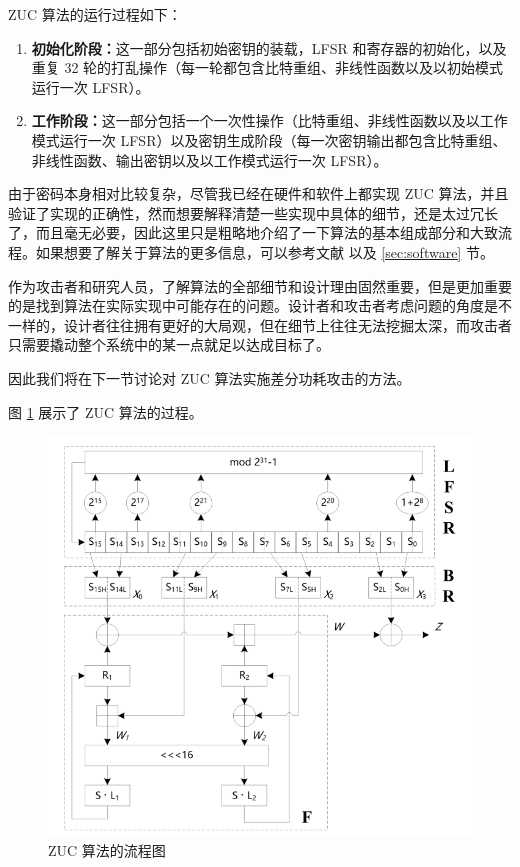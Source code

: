 \vspace*{0.5\baselineskip}

ZUC 算法的运行过程如下：\cite{zuc_standard}

\begin{enumerate}
    \item \textbf{初始化阶段：}这一部分包括初始密钥的装载，LFSR 和寄存器的初始化，以及重复 32 轮的打乱操作（每一轮都包含比特重组、非线性函数以及以初始模式运行一次 LFSR）。
    \item \textbf{工作阶段：}这一部分包括一个一次性操作（比特重组、非线性函数以及以工作模式运行一次 LFSR）以及密钥生成阶段（每一次密钥输出都包含比特重组、非线性函数、输出密钥以及以工作模式运行一次 LFSR）。
\end{enumerate}

\vspace*{0.5\baselineskip}

由于密码本身相对比较复杂，尽管我已经在硬件和软件上都实现 ZUC 算法，并且验证了实现的正确性，然而想要解释清楚一些实现中具体的细节，还是太过冗长了，而且毫无必要，因此这里只是粗略地介绍了一下算法的基本组成部分和大致流程。如果想要了解关于算法的更多信息，可以参考文献 \parencite{zuc_standard} 以及 \ref{sec:software} 节。

作为攻击者和研究人员，了解算法的全部细节和设计理由固然重要，但是更加重要的是找到算法在实际实现中可能存在的问题。设计者和攻击者考虑问题的角度是不一样的，设计者往往拥有更好的大局观，但在细节上往往无法挖掘太深，而攻击者只需要撬动整个系统中的某一点就足以达成目标了。

因此我们将在下一节讨论对 ZUC 算法实施差分功耗攻击的方法。

\vspace*{0.5\baselineskip}

图 \ref{fig:zuc_algo} 展示了 ZUC 算法的过程。

\begin{figure}[htbp]
    \centering
    \includegraphics[height=.5\textheight]{../images/zuc_algo.png}
    \caption{ZUC 算法的流程图 \cite{zuc_standard}}
    \label{fig:zuc_algo}
\end{figure}


